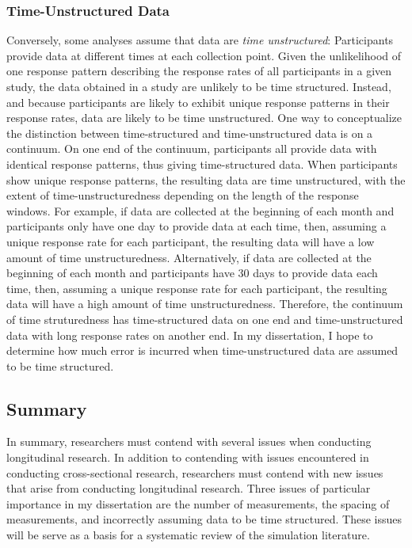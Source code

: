 \documentclass[
12pt, %
twoside,
english]{guelphthesis}
\begin{document}
\hypertarget{time-unstructured-data}{%
\subsubsection{Time-Unstructured Data}\label{time-unstructured-data}}

Conversely, some analyses assume that data are \emph{time unstructured}: Participants provide data at different times at each collection point. Given the unlikelihood of one response pattern describing the response rates of all participants in a given study, the data
obtained in a study are unlikely to be time structured. Instead, and because participants are likely to exhibit unique response
patterns in their response rates, data are likely to be time unstructured. One way to conceptualize the distinction between time-structured and time-unstructured data is on a continuum. On one end of the continuum, participants all provide data with identical response patterns, thus giving time-structured data. When participants show unique response patterns, the resulting data are time unstructured, with the extent of time-unstructuredness depending on the length of the response windows. For example, if data are collected at the beginning of each month and participants only have one day to provide data at each time, then, assuming a unique response rate for each participant, the resulting data will have a low amount of time unstructuredness. Alternatively, if data are collected at the beginning of each month and participants have 30 days to provide data each time, then, assuming a unique response rate for each participant, the resulting data will have a high amount of time unstructuredness. Therefore, the continuum of time struturedness has time-structured data on one end and time-unstructured data with long response rates on another end. In my dissertation, I hope to determine how much error is incurred when time-unstructured data are assumed to be time structured.

\hypertarget{summary}{%
\subsection{Summary}\label{summary}}

In summary, researchers must contend with several issues when conducting longitudinal research. In addition to contending with issues encountered in conducting cross-sectional research, researchers must contend with new issues that arise from conducting longitudinal research. Three issues of particular importance in my dissertation are the number of measurements, the spacing of measurements, and incorrectly assuming data to be time structured. These issues will be serve as a basis for a systematic review of the simulation literature.
\end{document}
